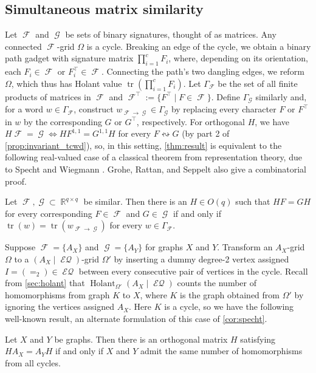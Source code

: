 \documentclass{article}
\DeclareMathOperator{\tr}{tr}
\DeclareMathOperator{\rr}{\mathbb{R}}
\DeclareMathOperator{\fc}{\mathcal{F}}
\DeclareMathOperator{\gc}{\mathcal{G}}
\DeclareMathOperator{\holant}{Holant}
\DeclareMathOperator{\eq}{\mathcal{EQ}}
\begin{document}
\subsection{Simultaneous matrix similarity}
Let $\fc$ and $\gc$ be sets of binary signatures, thought of as matrices. Any connected $\fc$-grid
$\Omega$
is a cycle. Breaking an edge of the cycle, we obtain a binary path gadget with signature matrix
$\prod_{i=1}^c F_i$, where, depending on its orientation, each $F_i \in \fc$ or $F_i^\top \in \fc$.
Connecting the path's two dangling edges, we reform $\Omega$, which thus has Holant value
$\tr\left(\prod_{i=1}^c F_i\right)$. Let $\Gamma_{\fc}$ be the set of all finite products of
matrices in $\fc$ and $\fc^\top := \{F^\top \mid F \in \fc\}$. Define $\Gamma_{\gc}$ similarly and,
for a word $w \in \Gamma_{\fc}$, construct $w_{\fc\to\gc} \in \Gamma_{\gc}$ by replacing every character
$F$ or $F^\top$ in $w$ by the corresponding $G$ or $G^\top$, respectively. 
For orthogonal $H$, we have $H\fc = \gc \iff HF^{1,1} = G^{1,1}H$ for every $F \leftrightsquigarrow G$
(by part 2 of \autoref{prop:invariant_tcwd}), so, in this
setting, \autoref{thm:result} is equivalent to the following real-valued case of a
classical theorem from representation theory, due to Specht \cite{specht} and Wiegmann \cite{wiegmann}.
Grohe, Rattan, and Seppelt \cite{grohe_homomorphism_2022} also give a combinatorial proof.
\begin{corollary}
    Let $\fc, \gc \subset \rr^{q\times q}$ be similar. 
    Then there is an $H \in O(q)$ such that $HF = GH$ 
    for every corresponding $F \in \fc$ and $G \in \gc$ if and only if
    $\tr(w) = \tr(w_{\fc\to\gc})$ for every $w \in \Gamma_{\fc}$.
    \label{cor:specht}
\end{corollary}

Suppose $\fc = \{A_X\}$ and $\gc = \{A_Y\}$ for graphs $X$ and $Y$.
Transform an
$A_X$-grid $\Omega$ to a $(A_X \mid \eq)$-grid $\Omega'$ by inserting a dummy degree-2 vertex assigned 
$I = (=_2) \in \eq$ between every consecutive pair of vertices in the cycle. Recall from
\autoref{sec:holant} that
$\holant_{\Omega'}(A_X \mid \eq)$ counts the number of homomorphisms from graph $K$ to $X$, where $K$ is the graph obtained from $\Omega'$ by ignoring the vertices assigned $A_X$. Here
$K$ is a cycle, so we have the following well-known result, an alternate formulation
of this case of \autoref{cor:specht}.
\begin{corollary}
    Let $X$ and $Y$ be graphs. Then there is an orthogonal matrix $H$ satisfying $H A_X = A_Y H$
    if and only if $X$ and $Y$ admit the same number of homomorphisms from all cycles.
    \label{cor:cycle}
\end{corollary}
\end{document}
